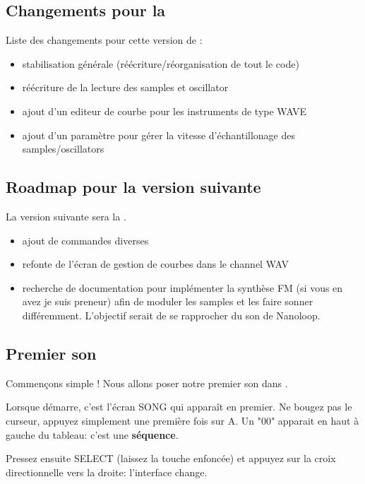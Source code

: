 \subsection{Changements pour la \fatversion}

Liste des changements pour cette version de \FAT: \medskip
\begin{itemize}
  \item{stabilisation générale (réécriture/réorganisation de tout le code)}
  \item{réécriture de la lecture des samples et oscillator}
  \item{ajout d'un editeur de courbe pour les instruments de type WAVE}
  \item{ajout d'un paramètre pour gérer la vitesse d'échantillonage des samples/oscillators}
\end{itemize}

\subsection{Roadmap pour la version suivante}

La version suivante sera la \fatnextversion. \medskip
\begin{itemize}
  \item{ajout de commandes diverses}
  \item{refonte de l'écran de gestion de courbes dans le channel WAV}
  \item{recherche de documentation pour implémenter la synthèse FM (si vous en avez je suis preneur) afin de moduler les samples et les faire sonner différemment.
              L'objectif serait de se rapprocher du son de Nanoloop.}
\end{itemize}

\subsection{Premier son}

Commençons simple ! Nous allons poser notre premier son dans \FAT.\medskip

Lorsque \FAT démarre, c'est l'écran SONG qui apparaît en premier.
Ne bougez pas le curseur, appuyez simplement une première fois sur A.
Un "00" apparait en haut à gauche du tableau: c'est une {\bf séquence}.


Pressez ensuite SELECT (laissez la touche enfoncée) et appuyez sur la croix directionnelle vers la droite: l'interface change.

